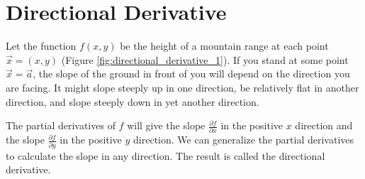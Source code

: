 \documentclass[conference,final,11pt,technote,onecolumn]{IEEEtran}\usepackage[]{graphicx}\usepackage[]{color}
\newenvironment{knitrout}{}{} %
\begin{document}
\begin{knitrout}
{}



\end{knitrout}

\section{Directional Derivative}
\label{term:directional_derivative}
Let the function $f(x,y)$ be the height of a mountain range at each point $\vec x=(x,y)$\cite{mathInsight:DirectionalDerivative} (Figure \ref{fig:directional_derivative_1}). If you stand at some point $\vec x=\vec a$, the slope of the ground in front of you will depend on the direction you are facing. It might slope steeply up in one direction, be relatively flat in another direction, and slope steeply down in yet another direction.

The partial derivatives of $f$ will give the slope $\frac{\partial f}{\partial x}$ in the positive $x$ direction and the slope $\frac{\partial f}{\partial y}$ in the positive $y$ direction. We can generalize the partial derivatives to calculate the slope in any direction. The result is called the directional derivative.
	
\end{document}
